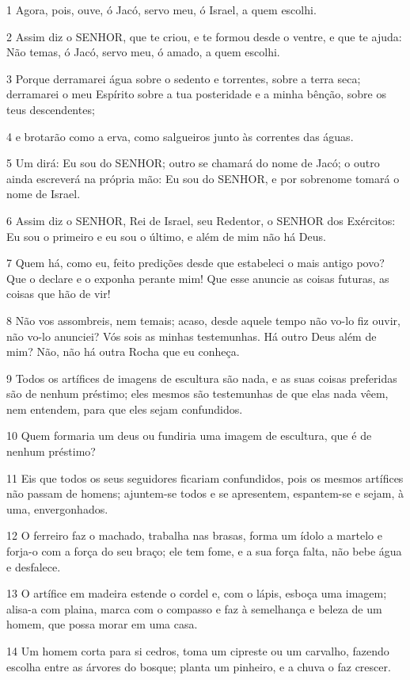 \par 1 Agora, pois, ouve, ó Jacó, servo meu, ó Israel, a quem escolhi.
\par 2 Assim diz o SENHOR, que te criou, e te formou desde o ventre, e que te ajuda: Não temas, ó Jacó, servo meu, ó amado, a quem escolhi.
\par 3 Porque derramarei água sobre o sedento e torrentes, sobre a terra seca; derramarei o meu Espírito sobre a tua posteridade e a minha bênção, sobre os teus descendentes;
\par 4 e brotarão como a erva, como salgueiros junto às correntes das águas.
\par 5 Um dirá: Eu sou do SENHOR; outro se chamará do nome de Jacó; o outro ainda escreverá na própria mão: Eu sou do SENHOR, e por sobrenome tomará o nome de Israel.
\par 6 Assim diz o SENHOR, Rei de Israel, seu Redentor, o SENHOR dos Exércitos: Eu sou o primeiro e eu sou o último, e além de mim não há Deus.
\par 7 Quem há, como eu, feito predições desde que estabeleci o mais antigo povo? Que o declare e o exponha perante mim! Que esse anuncie as coisas futuras, as coisas que hão de vir!
\par 8 Não vos assombreis, nem temais; acaso, desde aquele tempo não vo-lo fiz ouvir, não vo-lo anunciei? Vós sois as minhas testemunhas. Há outro Deus além de mim? Não, não há outra Rocha que eu conheça.
\par 9 Todos os artífices de imagens de escultura são nada, e as suas coisas preferidas são de nenhum préstimo; eles mesmos são testemunhas de que elas nada vêem, nem entendem, para que eles sejam confundidos.
\par 10 Quem formaria um deus ou fundiria uma imagem de escultura, que é de nenhum préstimo?
\par 11 Eis que todos os seus seguidores ficariam confundidos, pois os mesmos artífices não passam de homens; ajuntem-se todos e se apresentem, espantem-se e sejam, à uma, envergonhados.
\par 12 O ferreiro faz o machado, trabalha nas brasas, forma um ídolo a martelo e forja-o com a força do seu braço; ele tem fome, e a sua força falta, não bebe água e desfalece.
\par 13 O artífice em madeira estende o cordel e, com o lápis, esboça uma imagem; alisa-a com plaina, marca com o compasso e faz à semelhança e beleza de um homem, que possa morar em uma casa.
\par 14 Um homem corta para si cedros, toma um cipreste ou um carvalho, fazendo escolha entre as árvores do bosque; planta um pinheiro, e a chuva o faz crescer.
